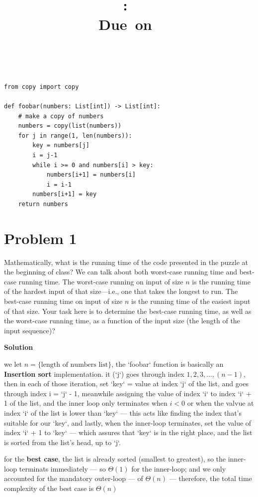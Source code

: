 \documentclass{article}
\title{
    \vspace{2in}
    \textmd{\textbf{\hmwkClass:\ \hmwkTitle}}\\
    \normalsize\vspace{0.1in}\small{Due\ on\ \hmwkDueDate}\\
    \vspace{0.1in}\large{\textit{\hmwkClassInstructor\ \hmwkClassTime}}
    \vspace{3in}
}
\author{\hmwkAuthorName}
\date{}
\newcommand{\solution}{\textbf{\large Solution}}
\theoremstyle{remark}
\begin{document}
\maketitle
\newpage

\begin{verbatim}
from copy import copy

def foobar(numbers: List[int]) -> List[int]:
    # make a copy of numbers
    numbers = copy(list(numbers))
    for j in range(1, len(numbers)):
        key = numbers[j]
        i = j-1
        while i >= 0 and numbers[i] > key:
            numbers[i+1] = numbers[i]
            i = i-1
        numbers[i+1] = key
    return numbers
\end{verbatim}

\section*{Problem 1}

Mathematically, what is the running time of the code presented in the puzzle at the beginning of class? We can talk about both worst-case running time and best-case running time. The worst-case running on input of size $n$ is the running time of the hardest input of that size---i.e., one that takes the longest to run. The best-case running time on input of size $n$ is the running time of the easiest input of that size. Your task here is to determine the best-case running time, as well as the worst-case running time, as a function of the input size (the length of the input sequence)?

\medskip
\solution

we let $n = \text{\{length of numbers list\}}$, the `foobar` function is basically an \textbf{Insertion sort} implementation. it (`j`) goes through index $1, 2, 3, ..., (n-1)$, then in each of those iteration, set `key` = {value at index `j` of the list}, and goes through index i = `j` - 1, meanwhile assigning the value of index `i` to index `i` + 1 of the list, and the inner loop only terminates when $i < 0$ or when {the valvue at index `i` of the list} is lower than `key` --- this acts like finding the index that's suitable for our `key`, and lastly, when the inner-loop terminates, set the value of index `i` + 1 to `key` --- which assures that `key` is in the right place, and the list is sorted from the list's head, up to `j`. 

\vspace{1em}

for the \textbf{best case}, the list is already sorted (smallest to greatest), so the inner-loop terminats immediately --- so $\Theta(1)$ for the inner-loop; and we only accounted for the mandatory outer-loop --- of $\Theta(n)$ --- therefore, the total time complexity of the best case is $\boxed{\Theta(n)}$
\end{document}
